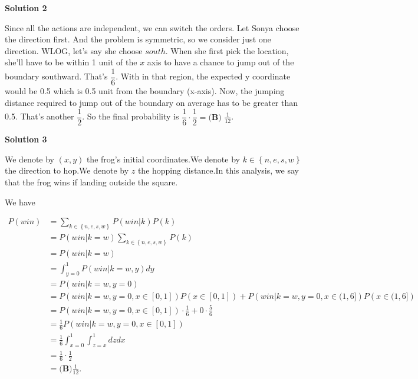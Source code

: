 \begin{enumerate}
 



\textbf{Solution 2}

Since all the actions are independent, we can switch the orders.  Let Sonya choose the direction first.  And the problem is symmetric, so we consider just one direction. WLOG, let's say she choose $south$. When she first pick the location, she'll have to be within 1 unit of the $x$ axis to have a chance to jump out of the boundary southward. That's $\dfrac{1}{6}$.  With in that region, the expected y coordinate would be 0.5 which is 0.5 unit from the boundary (x-axis).  Now, the jumping distance required to jump out of the boundary on average has to be greater than 0.5. That's another $\dfrac{1}{2}$.  So the final probability is $\dfrac{1}{6}\cdot\dfrac{1}{2} = \boxed{\textbf{(B) }\frac{1}{12}}$.

 



\textbf{Solution 3}

We denote by $\left( x, y \right)$ the frog's initial coordinates.We denote by $k \in \left\{ n, e, s, w \right\}$ the direction to hop.We denote by $z$ the hopping distance.In this analysis, we say that the frog wins if landing outside the square.

 We have

 \begin{align*}P \left( win \right)& = \sum_{k \in \left\{ n, e, s, w \right\}} P\left( win | k \right) P \left( k \right) \\& = P \left( win | k = w \right)\sum_{k \in \left\{ n, e, s, w \right\}}P \left( k \right) \\& = P \left( win | k = w \right) \\& = \int_{y=0}^1 P \left( win | k = w, y \right) dy \\& = P \left( win | k = w, y = 0 \right) \\& = P \left( win | k = w, y = 0, x \in [0,1] \right) P \left( x \in [0,1] \right)+ P \left( win | k = w, y = 0, x \in (1,6] \right) P \left( x \in (1,6] \right) \\& = P \left( win | k = w, y = 0, x \in [0,1] \right) \cdot \frac{1}{6}+ 0 \cdot \frac{5}{6} \\& = \frac{1}{6} P \left( win | k = w, y = 0, x \in [0,1] \right) \\& = \frac{1}{6} \int_{x=0}^1 \int_{z=x}^1 dz dx \\& = \frac{1}{6} \cdot \frac{1}{2} \\& = \boxed{\textbf{(B)}\frac{1}{12}}.\end{align*}



\end{enumerate}
